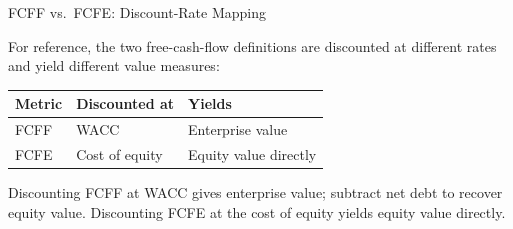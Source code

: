 \documentclass[9pt,t]{beamer}
\begin{document}
\begin{frame}[noframenumbering]{FCFF vs.\ FCFE: Discount-Rate Mapping}

For reference, the two free-cash-flow definitions are discounted at different
rates and yield different value measures:

\medskip
\begin{center}
\begin{tabular}{lll}
\toprule
Metric & Discounted at & Yields \\
\midrule
FCFF & WACC & Enterprise value \\
FCFE & Cost of equity & Equity value directly \\
\bottomrule
\end{tabular}
\end{center}

\medskip
Discounting FCFF at WACC gives enterprise value; subtract net debt to recover
equity value. Discounting FCFE at the cost of equity yields equity value directly.
\end{frame}
\end{document}
